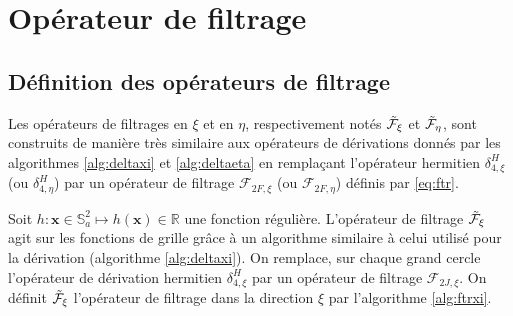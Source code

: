 \section{Opérateur de filtrage}

\subsection{Définition des opérateurs de filtrage}

Les opérateurs de filtrages en $\xi$ et en $\eta$, respectivement notés $\tilde{\mathcal{F}}_{\xi}$ et $\tilde{\mathcal{F}}_{\eta}$, sont construits de manière très similaire aux opérateurs de dérivations donnés par les algorithmes \ref{alg:deltaxi} et \ref{alg:deltaeta} en remplaçant l'opérateur hermitien $\delta^H_{4,\xi}$ (ou $\delta^H_{4,\eta}$) par un opérateur de filtrage $\mathcal{F}_{2F,\xi}$ (ou $\mathcal{F}_{2F,\eta}$) définis par \eqref{eq:ftr}.

Soit $h : \mathbf{x} \in \mathbb{S}_a^2 \mapsto h(\mathbf{x}) \in \mathbb{R}$ une fonction régulière. L'opérateur de filtrage $\tilde{\mathcal{F}}_{\xi}$ agit sur les fonctions de grille grâce à un algorithme similaire à celui utilisé pour la dérivation (algorithme  \ref{alg:deltaxi}). On remplace, sur chaque grand cercle l'opérateur de dérivation hermitien $\delta_{4,\xi}^H$ par un opérateur de filtrage $\mathcal{F}_{2J,\xi}$. On définit $\tilde{\mathcal{F}}_{\xi}$ l'opérateur de filtrage dans la direction $\xi$ par l'algorithme \ref{alg:ftrxi}.

